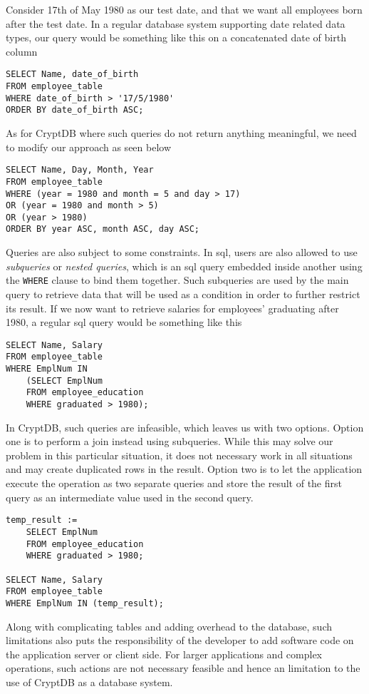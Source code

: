 Consider 17th of May 1980 as our test date, and that we want all employees born after the test date. In a regular database system supporting date related data types, our query would be something like this on a concatenated date of birth column

\begin{verbatim}
SELECT Name, date_of_birth
FROM employee_table
WHERE date_of_birth > '17/5/1980'
ORDER BY date_of_birth ASC;
\end{verbatim}

As for CryptDB where such queries do not return anything meaningful, we need to modify our approach as seen below

\begin{verbatim}
SELECT Name, Day, Month, Year
FROM employee_table
WHERE (year = 1980 and month = 5 and day > 17)
OR (year = 1980 and month > 5)
OR (year > 1980)
ORDER BY year ASC, month ASC, day ASC;
\end{verbatim}

Queries are also subject to some constraints. In \gls{sql}, users are also allowed to use \emph{subqueries} or \emph{nested queries}, which is an \gls{sql} query embedded inside another using the \verb!WHERE! clause to bind them together. Such subqueries are used by the main query to retrieve data that will be used as a condition in order to further restrict its result. If we now want to retrieve salaries for employees' graduating after 1980, a regular \gls{sql} query would be something like this

\begin{verbatim}
SELECT Name, Salary
FROM employee_table
WHERE EmplNum IN
    (SELECT EmplNum
    FROM employee_education
    WHERE graduated > 1980);
\end{verbatim}

In CryptDB, such queries are infeasible, which leaves us with two options. Option one is to perform a join instead using subqueries. While this may solve our problem in this particular situation, it does not necessary work in all situations and may create duplicated rows in the result. Option two is to let the application execute the operation as two separate queries and store the result of the first query as an intermediate value used in the second query.

\begin{verbatim}
temp_result :=
    SELECT EmplNum
    FROM employee_education
    WHERE graduated > 1980;

SELECT Name, Salary
FROM employee_table 
WHERE EmplNum IN (temp_result);
\end{verbatim}


Along with complicating tables and adding overhead to the database, such limitations also puts the responsibility of the developer to add software code on the application server or client side. For larger applications and complex operations, such actions are not necessary feasible and hence an limitation to the use of CryptDB as a database system.\\